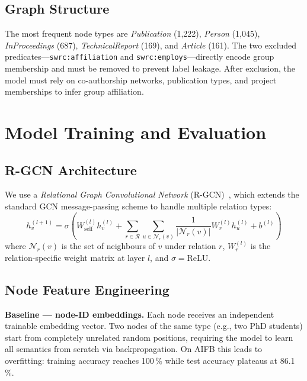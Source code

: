 \documentclass[runningheads]{llncs}
\begin{document}
\subsection{Graph Structure}

The most frequent node types are \emph{Publication} (1,222), \emph{Person} (1,045),
\emph{InProceedings} (687), \emph{TechnicalReport} (169), and \emph{Article} (161).
The two excluded predicates---\texttt{swrc:affiliation} and \texttt{swrc:employs}---directly encode
group membership and must be removed to prevent label leakage.
After exclusion, the model must rely on co-authorship networks, publication types,
and project memberships to infer group affiliation.

\section{Model Training and Evaluation}

\subsection{R-GCN Architecture}

We use a \emph{Relational Graph Convolutional Network} (R-GCN)~\cite{schlichtkrull2018},
which extends the standard GCN message-passing scheme to handle multiple relation types:
\[
h_v^{(l+1)} = \sigma\!\left(W_{\text{self}}^{(l)} h_v^{(l)}
  + \sum_{r \in \mathcal{R}} \sum_{u \in \mathcal{N}_r(v)}
    \frac{1}{|\mathcal{N}_r(v)|} W_r^{(l)} h_u^{(l)}
  + b^{(l)}\right)
\]
where $\mathcal{N}_r(v)$ is the set of neighbours of $v$ under relation $r$,
$W_r^{(l)}$ is the relation-specific weight matrix at layer $l$, and $\sigma = \text{ReLU}$.

\subsection{Node Feature Engineering}

\textbf{Baseline --- node-ID embeddings.}
Each node receives an independent trainable embedding vector.
Two nodes of the same type (e.g., two PhD students) start from completely unrelated random
positions, requiring the model to learn all semantics from scratch via backpropagation.
On AIFB this leads to overfitting: training accuracy reaches 100\,\% while test accuracy
plateaus at 86.1\,\%.
\end{document}
